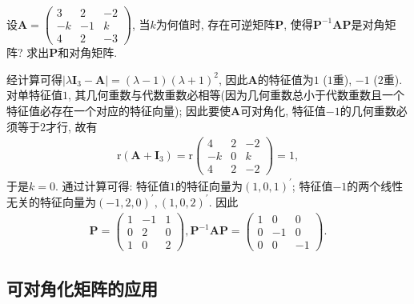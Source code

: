 \documentclass[../../main.tex]{subfiles}
\begin{document}
\begin{example}
设\(\boldsymbol{A}=\begin{pmatrix}
3&2&-2\\
-k&-1&k\\
4&2&-3
\end{pmatrix}\), 当\(k\)为何值时, 存在可逆矩阵\(\boldsymbol{P}\), 使得\(\boldsymbol{P}^{-1}\boldsymbol{AP}\)是对角矩阵? 求出\(\boldsymbol{P}\)和对角矩阵.
\end{example}
\begin{solution}
经计算可得\(\vert\lambda\boldsymbol{I}_{3}-\boldsymbol{A}\vert = (\lambda - 1)(\lambda + 1)^{2}\), 因此\(\boldsymbol{A}\)的特征值为\(1\) (\(1\)重), \(-1\) (\(2\)重). 对单特征值\(1\), 其几何重数与代数重数必相等(因为几何重数总小于代数重数且一个特征值必存在一个对应的特征向量); 因此要使\(\boldsymbol{A}\)可对角化, 特征值\(-1\)的几何重数必须等于\(2\)才行, 故有
\begin{align*}
\mathrm{r}(\boldsymbol{A}+\boldsymbol{I}_{3})=\mathrm{r}\begin{pmatrix}
4&2&-2\\
-k&0&k\\
4&2&-2
\end{pmatrix}=1,
\end{align*}
于是\(k = 0\). 通过计算可得: 特征值\(1\)的特征向量为\((1,0,1)^{\prime}\); 特征值\(-1\)的两个线性无关的特征向量为\((-1,2,0)^{\prime},(1,0,2)^{\prime}\). 因此
\begin{align*}
\boldsymbol{P}=\begin{pmatrix}
1&-1&1\\
0&2&0\\
1&0&2
\end{pmatrix}, \boldsymbol{P}^{-1}\boldsymbol{AP}=\begin{pmatrix}
1&0&0\\
0&-1&0\\
0&0&-1
\end{pmatrix}. 
\end{align*} 

\end{solution}

\subsection{可对角化矩阵的应用}
\end{document}
